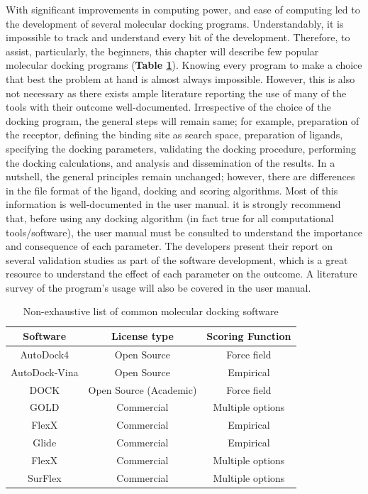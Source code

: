 \documentclass[12pt, a4paper]{article}
\begin{document}
With significant improvements in computing power, and ease of computing led to the development of several molecular docking programs. Understandably, it is impossible to track and understand every bit of the development. Therefore, to assist, particularly, the beginners, this chapter will describe few popular molecular docking programs (\textbf{Table \ref{tab:List}}).  Knowing every program to make a choice that best the problem at hand is almost always impossible. However, this is also not necessary as there exists ample literature reporting the use of many of the tools with their outcome well-documented. Irrespective of the choice of the docking program, the general steps will remain same; for example, preparation of the receptor, defining the binding site as search space, preparation of ligands, specifying the docking parameters, validating the docking procedure, performing the docking calculations, and analysis and dissemination of the results.  In a nutshell, the general principles remain unchanged; however, there are differences in the file format of the ligand, docking and scoring algorithms. Most of this information is well-documented in the user manual. it is strongly recommend that, before using any docking algorithm (in fact true for all computational tools/software), the user manual must be consulted to understand the importance and consequence of each parameter. The developers present their report on several validation studies as part of the software development, which is a great resource to understand the effect of each parameter on the outcome. A literature survey of the program's usage will also be covered in the user manual. 

\begin{table}[ht]
    \centering
    \caption{Non-exhaustive list of common molecular docking software}
    \label{tab:List}
    \begin{tabular}{|c c c |}
    \hline
         \textbf{Software} & \textbf{License type} & \textbf{Scoring Function}  \\
    \hline
        AutoDock4 & Open Source & Force field  \\
        AutoDock-Vina & Open Source & Empirical  \\
        DOCK & Open Source (Academic) & Force field  \\
        GOLD &  Commercial & Multiple options \\
        FlexX &  Commercial & Empirical \\
        Glide &  Commercial & Empirical \\
        FlexX & Commercial & Multiple options \\
        SurFlex & Commercial & Multiple options \\
    \hline
    \end{tabular}
\end{table}
\end{document}
